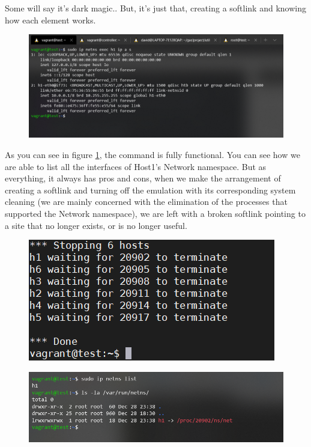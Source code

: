 \documentclass[12pt]{article}
\begin{document}
    
			Some will say it's dark magic.. But, it's just that, creating a softlink and knowing how each element works.

			\begin{figure}[!htb]
				\centering
				\includegraphics[width=\linewidth]{iproute2_fixed.png}
				\label{f:iproute2_fixed}
			\end{figure}

			As you can see in figure \ref{f:iproute2_fixed}, the command is fully functional. You can see how we are able to list all the interfaces of Host1's Network namespace. But as everything, it always has pros and cons, when we make the arrangement of creating a softlink and turning off the emulation with its corresponding system cleaning (we are mainly concerned with the elimination of the processes that supported the Network namespace), we are left with a broken softlink pointing to a site that no longer exists, or is no longer useful.
            \newpage
			\begin{figure}
				\centering
				\includegraphics[width=0.7\linewidth]{shutting_down.png}
				\label{f:shutting_down}
			\end{figure}

			\begin{figure}
				\centering
				\includegraphics[width=\linewidth]{broken_softlink.png}
				\label{f:broken_softlink}
			\end{figure}
\end{document}
